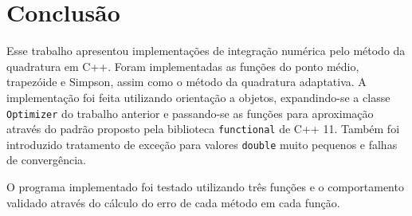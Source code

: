 \chapter{Conclusão}

Esse trabalho apresentou implementações de integração numérica pelo método da quadratura em C++. Foram implementadas as funções do ponto médio, trapezóide e Simpson, assim como o método da quadratura adaptativa. A implementação foi feita utilizando orientação a objetos, expandindo-se a classe \texttt{Optimizer} do trabalho anterior e passando-se as funções para aproximação através do padrão proposto pela biblioteca \texttt{functional} de C++ 11. Também foi introduzido tratamento de exceção para valores \texttt{double} muito pequenos e falhas de convergência.

O programa implementado foi testado utilizando três funções e o comportamento validado através do cálculo do erro de cada método em cada função.
